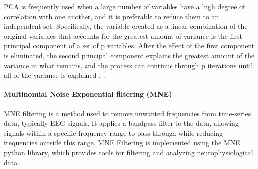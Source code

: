 \documentclass[conference]{IEEEtran}
\begin{document}
PCA is frequently used when a large number of variables have a high degree of correlation with one another, and it is preferable to reduce them to an independent set. Specifically, the variable created as a linear combination of the original variables that accounts for the greatest amount of variance is the first principal component of a set of p variables. After the effect of the first component is eliminated, the second principal component explains the greatest amount of the variance in what remains, and the process can continue through p iterations until all of the variance is explained \cite{jolliffe2016principal}, \cite{shao2014prototype}.




\paragraph{Multinomial Noise Exponential filtering (MNE)} MNE filtering is a method used to remove unwanted frequencies from time-series data, typically EEG signals. It applies a bandpass filter to the data, allowing signals within a specific frequency range to pass through while reducing frequencies outside this range. MNE Filtering is implemented using the MNE python library, which provides tools for filtering and analyzing neurophysiological data. 
\end{document}
